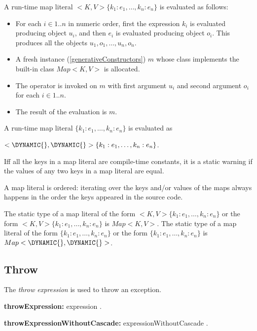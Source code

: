 \documentclass{article}
\begin{document}
\LMHash{}
A run-time map literal $<K, V>\{k_1:e_1, \ldots, k_n :e_n\}$ is evaluated as follows:
\begin{itemize}
\item
For each $i \in 1 .. n$ in numeric order,
first the expression $k_i$ is evaluated producing object $u_i$,
and then $e_i$ is evaluated producing object $o_i$.
This produces all the objects $u_1, o_1, \ldots, u_n, o_n$.
\item A fresh instance (\ref{generativeConstructors}) $m$ whose class implements the built-in class $Map<K, V>$ is allocated.
\item
The operator \code{[]=} is invoked on $m$ with first argument $u_i$ and second argument $o_i$ for each $i \in 1 .. n$.
\item
The result of the evaluation is $m$.
\end{itemize}

\LMHash{}
A run-time map literal $\{k_1:e_1, \ldots, k_n :e_n\}$ is evaluated as

$<\DYNAMIC{}, \DYNAMIC{}>\{k_1:e_1, \ldots, k_n :e_n\}$.

\LMHash{}
If{}f all the keys in a map literal are compile-time constants, it is a static warning if the values of any two keys in a map literal are equal.

\LMHash{}
A map literal is ordered: iterating over the keys and/or values of the maps always happens in the
 order the keys appeared in the source code.


\LMHash{}
The static type of a map literal of the form \CONST{}$ <K, V>\{k_1:e_1, \ldots, k_n :e_n\}$ or the form $<K, V>\{k_1:e_1, \ldots, k_n :e_n\}$ is $Map<K, V>$.
The static type of a map literal of the form \CONST{}$\{k_1:e_1, \ldots, k_n :e_n\}$ or the form $\{k_1:e_1, \ldots, k_n :e_n\}$ is $Map<\DYNAMIC{}, \DYNAMIC{}>$.


\subsection{Throw}

\LMHash{}
The {\em throw expression} is used to throw an exception.

\begin{grammar}
{\bf throwExpression:}\THROW{} expression
  .

{\bf throwExpressionWithoutCascade:}\THROW{} expressionWithoutCascade
  .
\end{grammar}
\end{document}
